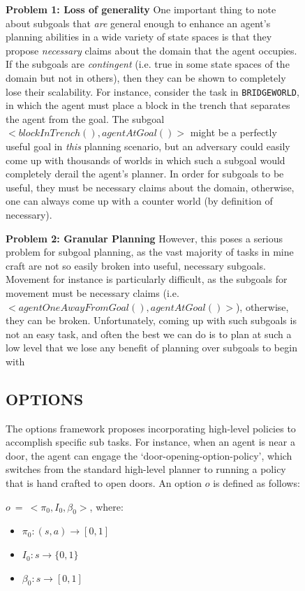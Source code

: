 \documentclass[]{article}
\begin{document}
\begin{figure}
{\bf Problem 1: Loss of generality}  One important thing to note about subgoals that {\it are} general enough to enhance an agent's planning abilities in a wide variety of state spaces is that they propose {\it necessary} claims about the domain that the agent occupies. If the subgoals are {\it contingent} (i.e. true in some state spaces of the domain but not in others), then they can be shown to completely lose their scalability. For instance, consider the task in \texttt{BRIDGEWORLD}, in which the agent must place a block in the trench that separates the agent from the goal. The subgoal $<blockInTrench(), agentAtGoal()>$ might be a perfectly useful goal in {\it this} planning scenario, but an adversary could easily come up with thousands of worlds in which such a subgoal would completely derail the agent's planner. In order for subgoals to be useful, they must be necessary claims about the domain, otherwise, one can always come up with a counter world (by definition of necessary). 

{\bf Problem 2: Granular Planning} However, this poses a serious problem for subgoal planning, as the vast majority of tasks in mine craft are not so easily broken into useful, necessary subgoals. Movement for instance is particularly difficult, as the subgoals for movement must be necessary claims (i.e. $<agentOneAwayFromGoal(), agentAtGoal()>$), otherwise, they can be broken. Unfortunately, coming up with such subgoals is not an easy task, and often the best we can do is to plan at such a low level that we lose any benefit of planning over subgoals to begin with



\subsection{OPTIONS}

The options framework proposes incorporating high-level policies to accomplish specific sub tasks. For instance, when an agent is near a door, the agent can engage the `door-opening-option-policy', which switches from the standard high-level planner to running a policy that is hand crafted to open doors. An option $o$ is defined as follows:

$o\ =\ <\pi_0, I_0, \beta_0>$, where:

\begin{itemize}
\item[] $\pi_0 : (s,a) \rightarrow [0,1]$
\item[] $I_0 : s \rightarrow \{0,1\}$
\item[] $\beta_0 : s \rightarrow [0,1]$
\end{itemize}


\end{figure}
\end{document}
